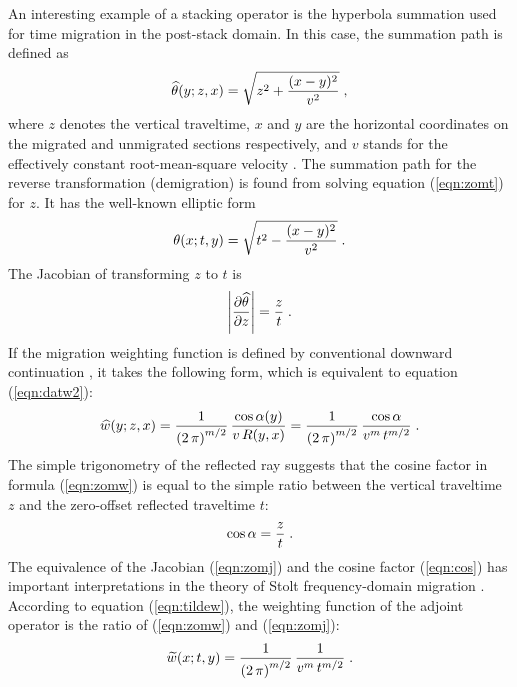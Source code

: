 An interesting example of a stacking operator is the hyperbola summation
used for time migration in the post-stack domain. In this case, the
summation path is defined as
\begin{equation}
\widehat{\theta}(y;z,x)  =  \sqrt{z^2+{{(x-y)^2}\over {v^2}}}\;,
\label{eqn:zomt}
\end{equation}
where $z$ denotes the vertical traveltime, $x$ and $y$ are the
horizontal coordinates on the migrated and unmigrated sections
respectively, and $v$ stands for the effectively constant
root-mean-square velocity \cite[]{Claerbout.bei.95}.  The summation path
for the reverse transformation (demigration) is found from solving
equation (\ref{eqn:zomt}) for $z$. It has the well-known elliptic form
\begin{equation}
\theta(x;t,y)  =  \sqrt{t^2-{{(x-y)^2}\over {v^2}}}\;.
\end{equation}
The Jacobian of transforming $z$ to $t$ is
\begin{equation}
\left|\partial \widehat{\theta} \over \partial z\right| = {z \over t}\;.
\label{eqn:zomj}
\end{equation}
If the migration weighting function is defined by conventional
downward continuation \cite[]{GEO43-01-00490076}, it takes the following form,
which is equivalent to equation (\ref{eqn:datw2}):
\begin{equation}
\widehat{w}(y;z,x)  =  {1\over{\left(2\,\pi\right)^{m/2}}} \,
{{\cos{\alpha(y)}}\over {v\,R(y,x)}} = 
{1\over{\left(2\,\pi\right)^{m/2}}} \,
{\cos{\alpha} \over {v^m\,t^{m/2}}}\;.
\label{eqn:zomw}
\end{equation}
The simple trigonometry of the reflected ray suggests that the cosine
factor in formula (\ref{eqn:zomw}) is equal to the simple ratio between the
vertical traveltime $z$ and the zero-offset reflected traveltime $t$:
\begin{equation}
\cos{\alpha} =  {z \over t}\;.
\label{eqn:cos}
\end{equation}
The equivalence of the Jacobian (\ref{eqn:zomj}) and the cosine factor
(\ref{eqn:cos}) has important interpretations in the theory of Stolt
frequency-domain migration
\cite[]{GEO43-01-00230048,GEO46-05-07170733,Levin.sep.48.147}.
According to equation (\ref{eqn:tildew}), the weighting function of the
adjoint operator is the ratio of (\ref{eqn:zomw}) and (\ref{eqn:zomj}):
\begin{equation}
\widetilde{w}(x;t,y) = {1\over{\left(2\,\pi\right)^{m/2}}} \,
{1 \over {v^m\,t^{m/2}}}\;.
\label{eqn:adjzomw}
\end{equation}
